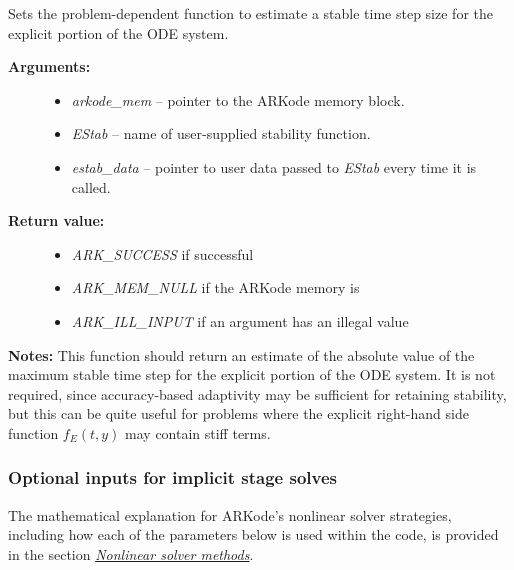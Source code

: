 \documentclass[letterpaper,10pt,english]{sphinxmanual}
\begin{document}
\begin{fulllineitems}
\label{c_interface/User_callable:ARKodeSetStabilityFn}
Sets the problem-dependent function to estimate a stable
time step size for the explicit portion of the ODE system.
\begin{description}
\item[{\textbf{Arguments:}}] \leavevmode\begin{itemize}
\item {} 
\emph{arkode\_mem} -- pointer to the ARKode memory block.

\item {} 
\emph{EStab} -- name of user-supplied stability function.

\item {} 
\emph{estab\_data} -- pointer to user data passed to \emph{EStab} every time
it is called.

\end{itemize}

\item[{\textbf{Return value:}}] \leavevmode\begin{itemize}
\item {} 
\emph{ARK\_SUCCESS} if successful

\item {} 
\emph{ARK\_MEM\_NULL} if the ARKode memory is 

\item {} 
\emph{ARK\_ILL\_INPUT} if an argument has an illegal value

\end{itemize}

\end{description}

\textbf{Notes:} This function should return an estimate of the absolute
value of the maximum stable time step for the explicit portion of
the ODE system.  It is not required, since accuracy-based
adaptivity may be sufficient for retaining stability, but this can
be quite useful for problems where the explicit right-hand side
function $f_E(t,y)$ may contain stiff terms.

\end{fulllineitems}



\subsubsection{Optional inputs for implicit stage solves}
\label{c_interface/User_callable:cinterface-cinterface-arkodesolverinputtable}\label{c_interface/User_callable:optional-inputs-for-implicit-stage-solves}
The mathematical explanation for ARKode's nonlinear solver strategies,
including how each of the parameters below is used within the code, is
provided in the section {\hyperref[Mathematics:mathematics-nonlinear]{\emph{Nonlinear solver methods}}}.
\end{document}

